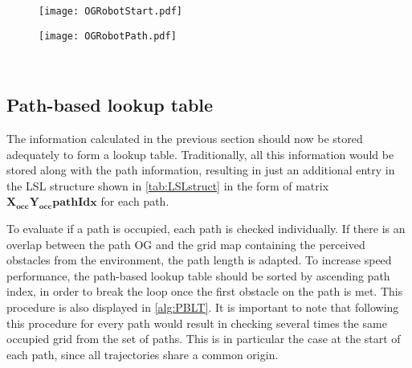 \newpage

\begin{figure}[!htbp]
\centering
	\begin{minipage}[b]{.45\linewidth}
		\centering
		\texttt{[image: OGRobotStart.pdf]}
	\end{minipage}
	\hfill%
	\centering
	\begin{minipage}[b]{.45\linewidth}
		\centering
		\texttt{[image: OGRobotPath.pdf]}
	\end{minipage}\\[-7pt]
	\begin{minipage}[t]{.45\linewidth}
	\end{minipage}
	\hfill
	\begin{minipage}[t]{.45\linewidth}
	\end{minipage}
\end{figure}
\vspace{-1.5cm}

\subsection{Path-based lookup table} \label{sec:PBLT}
The information calculated in the previous section should now be stored adequately to form a lookup table. Traditionally, all this information would be stored along with the path information, resulting in just an additional entry in the LSL structure shown in \cref{tab:LSLstruct} in the form of matrix $\bm{X_{occ}Y_{occ}pathIdx}$ for each path.

To evaluate if a path is occupied, each path is checked individually. If there is an overlap between the path OG and the grid map containing the perceived obstacles from the environment, the path length is adapted. To increase speed performance, the path-based lookup table should be sorted by ascending path index, in order to break the loop once the first obstacle on the path is met. This procedure is also displayed in \cref{alg:PBLT}. It is important to note that following this procedure for every path would result in checking several times the same occupied grid from the set of paths. This is in particular the case at the start of each path, since all trajectories share a common origin.

